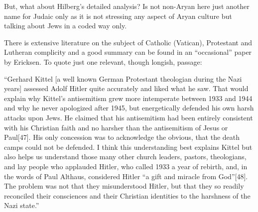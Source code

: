 But, what about Hilberg's detailed analysis? Is not non-Aryan here just another name for Judaic only as it is not stressing any aspect of Aryan culture but talking about Jews in a coded way only.

There is extensive literature on the subject of Catholic (Vatican), Protestant and Lutheran complicity and a good summary can be found in an “occasional” paper by Ericksen. To quote just one relevant, though longish, passage:

\begin{myquote}
“Gerhard Kittel [a well known German Protestant theologian during the Nazi years] assessed Adolf Hitler quite accurately and liked what he saw. That would explain why Kittel’s antisemitism grew more intemperate between 1933 and 1944 and why he never apologized after 1945, but energetically defended his own harsh attacks upon Jews. He claimed that his antisemitism had been entirely consistent with his Christian faith and no harsher than the antisemitism of Jesus or Paul[47]. His only concession was to acknowledge the obvious, that the death camps could not be defended. I think this understanding best explains Kittel but also helps us understand those many other church leaders, pastors, theologians, and lay people who applauded Hitler, who called 1933 a year of rebirth, and, in the words of Paul Althaus, considered Hitler “a gift and miracle from God”[48]. The problem was not that they misunderstood Hitler, but that they so readily reconciled their consciences and their Christian identities to the harshness of the Nazi state.”


\end{myquote}
